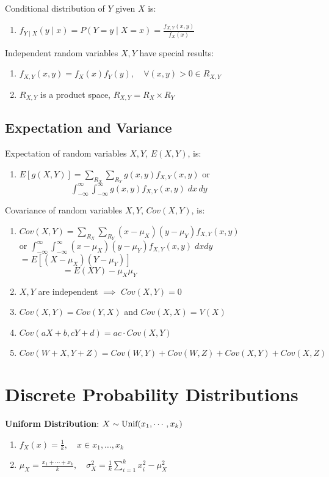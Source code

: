 \documentclass[12pt, a4paper]{article}
\begin{document}
\begin{multicols*}{3}
Conditional distribution of $Y$ given $X$ is:
\begin{enumerate}[\roman*.]
  \item $f_{Y\mid X}(y\mid x) = P(Y=y \mid X=x) = \displaystyle\frac{f_{X, Y}(x, y)}{f_X(x)}$
\end{enumerate}

Independent random variables $X, Y$ have special results:
\begin{enumerate}[\roman*.]
  \item $f_{X,Y}(x,y) = f_X(x)f_Y(y),\quad\forall (x,y) > 0 \in R_{X, Y}$
  \item $R_{X, Y}$ is a product space, $R_{X, Y} = R_X \times R_Y $
\end{enumerate}

\subsection{Expectation and Variance}
Expectation of random variables $X, Y$, $E(X, Y)$, is:
\begin{enumerate}[\roman*.]
  \item $E[g(X, Y)] = \sum_{R_X}\sum_{R_Y} g(x, y) f_{X, Y}(x, y)$ or\\$\quad\quad\quad\quad\quad\quad\int^{\infty}_{-\infty}\int^{\infty}_{-\infty}g(x, y) f_{X, Y}(x, y)\;dx\,dy$
\end{enumerate}

Covariance of random variables $X, Y$, $Cov(X, Y)$, is:
\begin{enumerate}[\roman*.]
  \item $Cov(X, Y) = \sum_{R_X}\sum_{R_Y}(x-\mu_X)(y-\mu_Y)f_{X, Y}(x, y)$\\\quad\quad\quad or $\int^{\infty}_{-\infty}\int^{\infty}_{-\infty} (x-\mu_{X})(y-\mu_{Y})f_{X, Y}(x, y)\;dxdy$\\\quad\quad\quad\quad\quad$=E[(X-\mu_X)(Y-\mu_Y)]$\\$\quad\quad\quad\quad\quad=E(XY)-\mu_X\mu_Y$
  \item $X, Y$ are independent $\implies$ $Cov(X, Y) = 0$
  \item $Cov(X, Y) = Cov(Y, X)$ and $Cov(X, X) = V(X)$
  \item $Cov(aX + b, cY+d) = ac\cdot Cov(X,Y)$
  \item $Cov(W+X, Y+Z) = Cov(W, Y) + Cov(W, Z) + Cov(X, Y) + Cov(X, Z)$
\end{enumerate}
\vspace{-1em}
\colbreak
\section{Discrete Probability Distributions}
\textbf{Uniform Distribution}: $X \sim \text{Unif}({x_1,\cdots,x_k})$
\begin{enumerate}[\roman*.]
  \item $f_X(x) = \frac{1}{k},\quad x \in {x_1,\dots,x_k}$
  \item $\mu_X = \frac{x_1+\cdots+x_k}{k},\quad\sigma^2_X = \frac{1}{k}\sum^k_{i=1}x_i^2-\mu_X^2$
\end{enumerate}


\end{multicols*}
\end{document}
